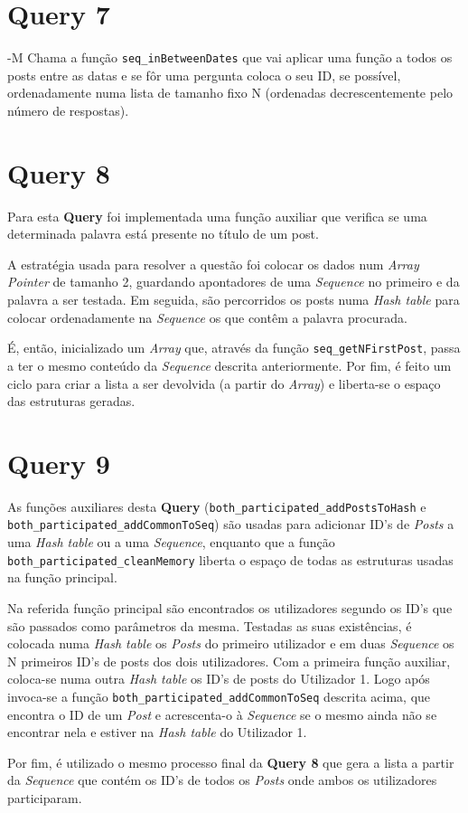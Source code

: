 \documentclass[a4paper]{report}
\begin{document}
	\section{Query 7} -M
	\tab Chama a função \verb+seq_inBetweenDates+ que vai aplicar uma função a todos os posts entre as datas e  se fôr uma pergunta coloca o seu ID, se possível, ordenadamente numa lista de tamanho fixo N (ordenadas decrescentemente pelo número de respostas).

	\section{Query 8}
	\tab Para esta \textbf{Query} foi implementada uma função auxiliar que verifica se uma determinada palavra está presente no título de um post. \par
	A estratégia usada para resolver a questão foi colocar os dados num  \textit{Array Pointer} de tamanho 2, guardando apontadores de uma \textit{Sequence} no primeiro e da palavra a ser testada. Em seguida, são percorridos os posts numa \textit{Hash table} para colocar ordenadamente na \textit{Sequence} os que contêm a palavra procurada. \par
	É, então, inicializado um \textit{Array} que, através da função \verb+seq_getNFirstPost+, passa a ter o mesmo conteúdo da \textit{Sequence} descrita anteriormente. Por fim, é feito um ciclo para criar a lista a ser devolvida (a partir do \textit{Array}) e liberta-se o espaço das estruturas geradas.

	\section{Query 9}
	\tab As funções auxiliares desta \textbf{Query} (\verb+both_participated_addPostsToHash+ e \verb+both_participated_addCommonToSeq+) são usadas para adicionar ID's de \textit{Posts} a uma \textit{Hash table} ou a uma \textit{Sequence}, enquanto que a função \\
\verb+both_participated_cleanMemory+ liberta o espaço de todas as estruturas usadas na função principal. \par
	Na referida função principal são encontrados os utilizadores segundo os ID's que são passados como parâmetros da mesma. Testadas as suas existências, é colocada numa  \textit{Hash table} os \textit{Posts} do primeiro utilizador e em duas \textit{Sequence} os N primeiros ID's de posts dos dois utilizadores. Com a primeira função auxiliar, coloca-se numa outra \textit{Hash table} os ID's de posts do Utilizador 1. Logo após invoca-se a função \verb+both_participated_addCommonToSeq+ descrita acima, que encontra o ID de um \textit{Post} e acrescenta-o à \textit{Sequence} se o mesmo ainda não se encontrar nela e estiver na \textit{Hash table} do Utilizador 1. \par
	Por fim, é utilizado o mesmo processo final da \textbf{Query 8} que gera a lista a partir da \textit{Sequence} que contém os ID's de todos os \textit{Posts} onde ambos os utilizadores participaram.
\end{document}
